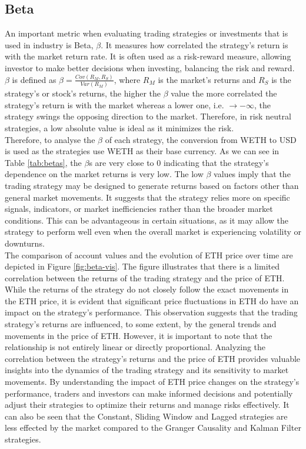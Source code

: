 \subsection{Beta}
An important metric when evaluating trading strategies or investments that is used in industry is Beta, $\beta$. It measures how correlated the strategy's return is with the market return rate. It is often used as a risk-reward measure, allowing investor to make better decisions when investing, balancing the risk and reward. $\beta$ is defined as $\beta = \frac{Cov(R_M, R_S)}{Var(R_M)}$, where $R_M$ is the market's returns and $R_S$ is the strategy's or stock's returns, the higher the $\beta$ value the more correlated the strategy's return is with the market whereas a lower one, i.e. $\rightarrow - \infty$, the strategy swings the opposing direction to the market. Therefore, in risk neutral strategies, a low absolute value is ideal as it minimizes the risk.
\\[5mm]
Therefore, to analyse the $\beta$ of each strategy, the conversion from WETH to USD is used as the strategies use WETH as their base currency. As we can see in Table \ref{tab:betas}, the $\beta$s are very close to 0 indicating that the strategy's dependence on the market returns is very low. The low $\beta$ values imply that the trading strategy may be designed to generate returns based on factors other than general market movements. It suggests that the strategy relies more on specific signals, indicators, or market inefficiencies rather than the broader market conditions. This can be advantageous in certain situations, as it may allow the strategy to perform well even when the overall market is experiencing volatility or downturns.
\\[5mm]
The comparison of account values and the evolution of ETH price over time are depicted in Figure \ref{fig:beta-vis}. The figure illustrates that there is a limited correlation between the returns of the trading strategy and the price of ETH. While the returns of the strategy do not closely follow the exact movements in the ETH price, it is evident that significant price fluctuations in ETH do have an impact on the strategy's performance. This observation suggests that the trading strategy's returns are influenced, to some extent, by the general trends and movements in the price of ETH. However, it is important to note that the relationship is not entirely linear or directly proportional. Analyzing the correlation between the strategy's returns and the price of ETH provides valuable insights into the dynamics of the trading strategy and its sensitivity to market movements. By understanding the impact of ETH price changes on the strategy's performance, traders and investors can make informed decisions and potentially adjust their strategies to optimize their returns and manage risks effectively. It can also be seen that the Constant, Sliding Window and Lagged strategies are less effected by the market compared to the Granger Causality and Kalman Filter strategies.

